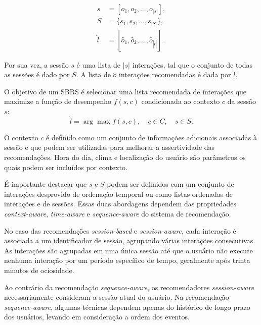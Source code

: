   \begin{equation*}
  \begin{aligned}
  s & = [o_1, o_2, \ldots, o_{|s|}], \\
  S & = \{s_1, s_2, \ldots, s_{|S|}\}, \\
  \hat{l} & = [\hat{o}_1, \hat{o}_2, \ldots, \hat{o}_{|\hat{l}|}].
  \end{aligned}
  \end{equation*}
  
    Por sua vez, a sessão $s$ é uma lista de $|s|$ interações, tal que o
  conjunto de todas as sessões é dado por $S$. A lista de $\hat{o}$ interações
  recomendadas é dada por $\hat{l}$.

  O objetivo de um SBRS é selecionar uma lista recomendada de interações
  que maximize a função de desempenho $f(s, c)$ condicionada ao contexto $c$ da
  sessão $s$:
  \[\hat{l} = \arg \max f(s, c), \quad c \in C, \quad s \in S.\]   

 O contexto $c$ é definido como um conjunto de informações adicionais associadas
  à sessão e que podem ser utilizadas para melhorar a assertividade das
  recomendações.  Hora do dia, clima e localização do usuário são parâmetros os
  quais podem ser incluídos por contexto.

  É importante destacar que $s$ e $S$ podem
  ser definidos com um conjunto de interações desprovido de ordenação temporal
  ou como listas ordenadas de interações e de sessões. Essas duas abordagens
  dependem das propriedades \textit{context-aware}, \textit{time-aware}
  e \textit{sequence-aware} do sistema de recomendação.

  No caso das recomendações \textit{session-based} e \textit{session-aware},
  cada interação é associada a um identificador de sessão, agrupando várias
  interações consecutivas. As interações são agrupadas em uma única sessão até
  que o usuário não execute nenhuma interação por um período específico de
  tempo, geralmente após trinta minutos de ociosidade.
  
  Ao contrário da recomendação \textit{sequence-aware}, os recomendadores
  \textit{session-aware} necessariamente consideram a sessão atual do usuário.
  Na recomendação \textit{sequence-aware}, algumas técnicas dependem apenas do
  histórico de longo prazo dos usuários, levando em consideração a ordem dos
  eventos.



